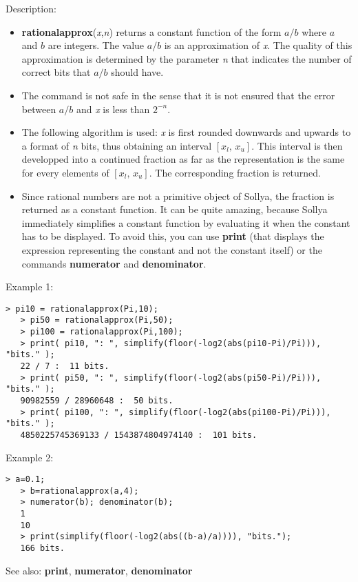 \noindent Description: \begin{itemize}

\item \textbf{rationalapprox}(\emph{x},\emph{n}) returns a constant function of the form $a/b$ where $a$ and $b$ are
   integers. The value $a/b$ is an approximation of \emph{x}. The quality of this 
   approximation is determined by the parameter \emph{n} that indicates the number of
   correct bits that $a/b$ should have.

\item The command is not safe in the sense that it is not ensured that the error 
   between $a/b$ and \emph{x} is less than $2^{-n}$.

\item The following algorithm is used: \emph{x} is first rounded downwards and upwards to
   a format of \emph{n} bits, thus obtaining an interval $[x_l,\,x_u]$. This interval is then
   developped into a continued fraction as far as the representation is the same
   for every elements of $[x_l,\,x_u]$. The corresponding fraction is returned.

\item Since rational numbers are not a primitive object of Sollya, the fraction is
   returned as a constant function. It can be quite amazing, because Sollya
   immediately simplifies a constant function by evaluating it when the constant
   has to be displayed.
   To avoid this, you can use \textbf{print} (that displays the expression representing
   the constant and not the constant itself) or the commands \textbf{numerator} 
   and \textbf{denominator}.
\end{itemize}
\noindent Example 1: 
\begin{center}\begin{minipage}{14.8cm}\begin{Verbatim}[frame=single]
   > pi10 = rationalapprox(Pi,10);
   > pi50 = rationalapprox(Pi,50);
   > pi100 = rationalapprox(Pi,100);
   > print( pi10, ": ", simplify(floor(-log2(abs(pi10-Pi)/Pi))), "bits." );
   22 / 7 :  11 bits.
   > print( pi50, ": ", simplify(floor(-log2(abs(pi50-Pi)/Pi))), "bits." );
   90982559 / 28960648 :  50 bits.
   > print( pi100, ": ", simplify(floor(-log2(abs(pi100-Pi)/Pi))), "bits." );
   4850225745369133 / 1543874804974140 :  101 bits.
\end{Verbatim}
\end{minipage}\end{center}
\noindent Example 2: 
\begin{center}\begin{minipage}{14.8cm}\begin{Verbatim}[frame=single]
   > a=0.1;
   > b=rationalapprox(a,4);
   > numerator(b); denominator(b);
   1
   10
   > print(simplify(floor(-log2(abs((b-a)/a)))), "bits.");
   166 bits.
\end{Verbatim}
\end{minipage}\end{center}
See also: \textbf{print}, \textbf{numerator}, \textbf{denominator}

